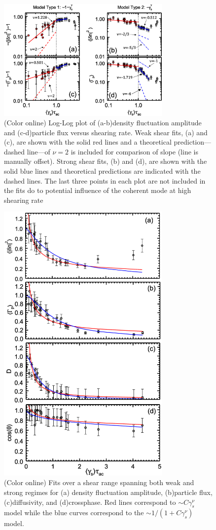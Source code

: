 \documentclass[aip,pop,amsmath,amssymb,peprint,superscriptaddress]{revtex4-1} %
\begin{document}
\begin{figure}[!htbp]
\centerline{
\includegraphics[width=8.5cm]{figure9.eps}}
\caption{\label{fig:densloglog_strong} (Color online) Log-Log plot of (a-b)density
  fluctuation amplitude and (c-d)particle flux versus shearing rate. Weak shear fits, (a) and (c), are shown with the solid red lines and a theoretical prediction---dashed line---of $\nu = 2$ is included for comparison of slope (line is manually offset). Strong shear fits, (b) and (d), are shown with the solid blue lines and theoretical predictions are indicated with the dashed lines. The last three points in each plot are not included in the fits do to potential influence of the coherent mode at high shearing rate}
\end{figure}

\begin{figure}[!htbp]
\centerline{
\includegraphics[width=8.5cm]{figure10.eps}}
\caption{\label{fig:fullrange_fits} (Color online) Fits over a shear range spanning both weak and strong regimes for (a) density fluctuation amplitude, (b)particle flux, (c)diffusivity, and (d)crossphase. Red lines correspond to $\sim C\gamma_{s}^{\nu}$ model while the blue curves correspond to the $\sim 1/(1+C\gamma_{s}^{\nu})$ model.}
\end{figure}
\end{document}
